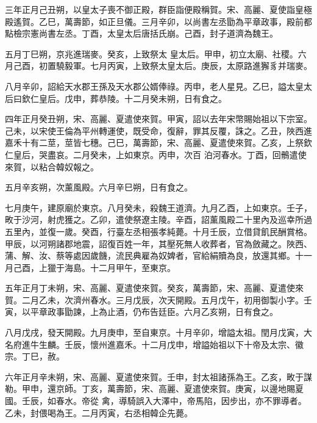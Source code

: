 \begin{pinyinscope}
 三年正月己丑朔，以皇太子喪不御正殿，群臣詣便殿稱賀。宋、高麗、夏使詣皇極殿遙賀。乙巳，萬壽節，如正旦儀。三月辛卯，以尚書左丞勖為平章政事，殿前都點檢宗憲尚書左丞。丁酉，太皇太后唐括氏崩。己酉，封子道濟為魏王。



 五月丁巳朔，京兆進瑞麥。癸亥，上致祭太
 皇太后。甲申，初立太廟、社稷。六月己酉，初置驍毅軍。七月丙寅，上致祭太皇太后。庚辰，太原路進獬豸并瑞麥。



 八月辛卯，詔給天水郡王孫及天水郡公婿俸祿。丙申，老人星見。乙巳，謚太皇太后曰欽仁皇后。戊申，葬恭陵。十二月癸未朔，日有食之。



 四年正月癸丑朔，宋、高麗、夏遣使來賀。甲寅，詔以去年宋幣賜始祖以下宗室。己未，以宋使王倫為平州轉運使，既受命，復辭，罪其反覆，誅之。乙丑，陜西進嘉禾十有二莖，莖皆七穗。己巳，萬壽節，宋、高麗、夏遣使來賀。乙亥，上祭欽仁皇后，哭盡哀。二月癸未，上如東京。丙申，次百
 泊河春水。丁酉，回鶻遣使來賀，以粘合韓奴報之。



 五月辛亥朔，次薰風殿。六月辛巳朔，日有食之。



 七月庚午，建原廟於東京。八月癸未，殺魏王道濟。九月乙酉，上如東京。壬子，畋于沙河，射虎獲之。乙卯，遣使祭遼主陵。辛酉，詔薰風殿二十里內及巡幸所過五里內，並復一歲。癸酉，行臺左丞相張孝純薨。十月壬辰，立借貸飢民酬賞格。甲辰，以河朔諸郡地震，詔復百姓一年，其壓死無人收葬者，官為斂藏之。陜西、蒲、解、汝、蔡等處因歲饑，流民典雇為奴婢者，官給絹贖為良，放還其鄉。十一月己酉，上獵于海島。十二月甲午，至東京。



 五年正月丁未朔，宋、高麗、夏遣使來賀。癸亥，萬壽節，宋、高麗、夏遣使來賀。二月乙未，次濟州春水。三月戊辰，次天開殿。五月戊午，初用御製小字。壬寅，以平章政事勖諫，上為止酒，仍布告廷臣。六月乙亥朔，日有食之。



 八月戊戌，發天開殿。九月庚申，至自東京。十月辛卯，增謚太祖。閏月戊寅，大名府進牛生麟。壬辰，懷州進嘉禾。十二月戊申，增謚始祖以下十帝及太宗、徽宗。丁巳，赦。



 六年正月辛未朔，宋、高麗、夏遣使來賀。壬申，封太祖諸孫為王。乙亥，畋于謀勒。甲申，還京師。丁亥，萬壽節，宋、高麗、夏遣使來賀。庚寅，以邊地賜夏國。壬辰，如春水。帝從
 禽，導騎誤入大澤中，帝馬陷，因步出，亦不罪導者。乙未，封偎喝為王。二月丙寅，右丞相韓企先薨。




\end{pinyinscope}
